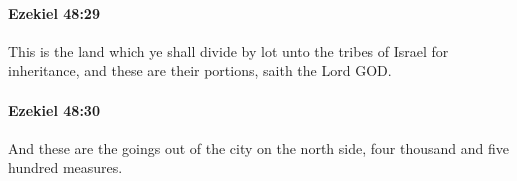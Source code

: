 		\paragraph{Ezekiel 48:29} %
			\label{EZEKIEL-48-29}

			This is the land which ye shall divide by lot unto the tribes of Israel for inheritance, and these are their portions, saith the Lord GOD.


		\paragraph{Ezekiel 48:30} %
			\label{EZEKIEL-48-30}

			And these are the goings out of the city on the north side, four thousand and five hundred measures.


